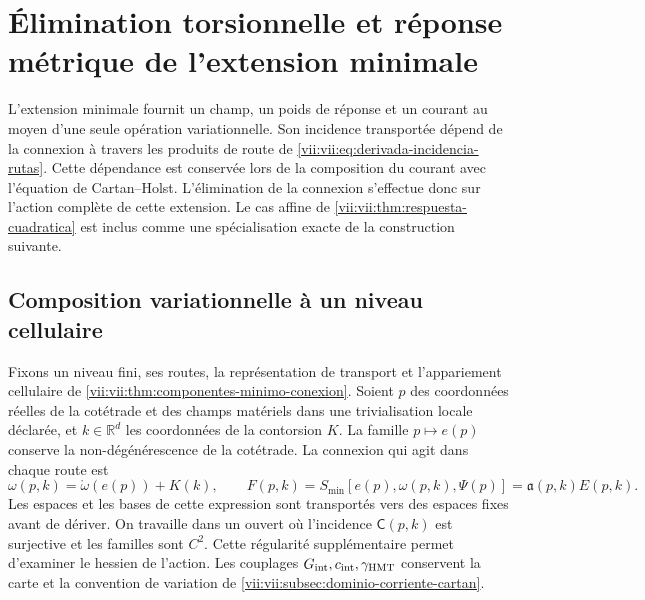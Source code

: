 
\section{Élimination torsionnelle et réponse métrique de l'extension minimale}
\label{vii:vii:sec:eliminacion-torsional-no-lineal}

L'extension minimale fournit un champ, un poids de réponse et un courant au moyen d'une seule opération variationnelle. Son incidence transportée dépend de la connexion à travers les produits de route de \eqref{vii:vii:eq:derivada-incidencia-rutas}. Cette dépendance est conservée lors de la composition du courant avec l'équation de Cartan--Holst. L'élimination de la connexion s'effectue donc sur l'action complète de cette extension. Le cas affine de \ref{vii:vii:thm:respuesta-cuadratica} est inclus comme une spécialisation exacte de la construction suivante.

\subsection{Composition variationnelle à un niveau cellulaire}
\label{vii:vii:subsec:composicion-torsional-celular}

Fixons un niveau fini, ses routes, la représentation de transport et
l'appariement cellulaire de
\ref{vii:vii:thm:componentes-minimo-conexion}. Soient \(p\) des coordonnées
réelles de la cotétrade et des champs matériels dans une trivialisation
locale déclarée, et \(k\in\mathbb R^d\) les coordonnées de la
contorsion \(K\). La famille \(p\mapsto e(p)\) conserve la
non-dégénérescence de la cotétrade. La connexion qui agit dans chaque route est
\begin{equation}
 \omega(p,k)=\mathring\omega(e(p))+K(k),\qquad
 F(p,k)=S_{\min}[e(p),\omega(p,k),\Psi(p)]
       =\mathfrak a(p,k)E(p,k).
 \label{vii:vii:eq:accion-minima-en-contorsion}
\end{equation}
Les espaces et les bases de cette expression sont transportés vers des espaces
fixes avant de dériver. On travaille dans un ouvert où l'incidence
\(\mathsf C(p,k)\) est surjective et les familles sont \(C^2\).
Cette régularité supplémentaire permet d'examiner le hessien de l'action.
Les couplages \(G_{\rm int},c_{\rm int},\gamma_{\rm HMT}\)
conservent la carte et la convention de variation de
\ref{vii:vii:subsec:dominio-corriente-cartan}.

